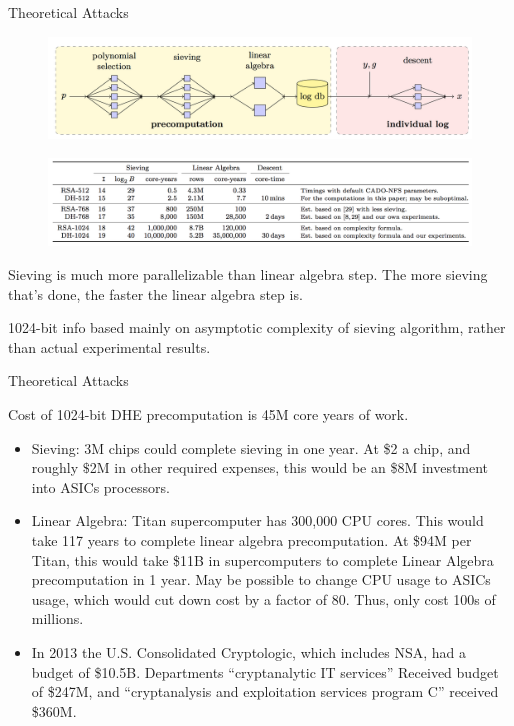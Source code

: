 \documentclass[presentation, aspectratio=54]{beamer}
\begin{document}

\begin{frame}{Theoretical Attacks}

\begin{figure}
\centering
\includegraphics[width=0.86\columnwidth]{graphics/DLOGalg.png}
\end{figure}

\begin{figure}
\centering
\includegraphics[width=0.86\columnwidth]{graphics/DLOGtable.png}
\end{figure}

Sieving is much more parallelizable than linear algebra step. The more sieving
that's done, the faster the linear algebra step is.

1024-bit info based mainly on asymptotic complexity of sieving algorithm, rather
than actual experimental results.

\end{frame}


\begin{frame}{Theoretical Attacks}

Cost of 1024-bit DHE precomputation is 45M core years of work.
\begin{itemize}
\item Sieving: 3M chips could complete sieving in one year. At \$2 a chip,
      and roughly $\$$2M in other required expenses, this would be an \$8M
      investment into ASICs processors.
\item Linear Algebra: Titan supercomputer has 300,000 CPU cores. This would
      take 117 years to complete linear algebra precomputation. At \$94M per
      Titan, this would take \$11B in supercomputers to complete Linear
      Algebra precomputation in 1 year. May be possible to change CPU usage
      to ASICs usage, which would cut down cost by a factor of 80. Thus,
      only cost 100s of millions. 
\item In 2013 the U.S. Consolidated Cryptologic, which includes NSA, had a
      budget of \$10.5B. Departments ``cryptanalytic IT services'' Received
      budget of \$247M, and ``cryptanalysis and exploitation services program
      C'' received \$360M. 
\end{itemize}

\end{frame}
\end{document}
